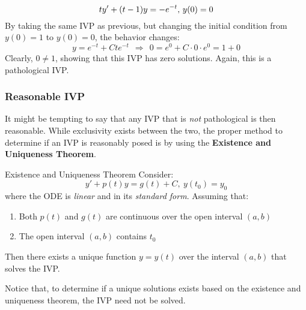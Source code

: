 \documentclass[12pt]{article}
\begin{document}
\begin{example}
  \begin{equation*}
    ty'+(t-1)y = -e^{-t}\textup{,}\ y(0) = 0
  \end{equation*}
  By taking the same IVP as previous, but changing the initial condition from $y(0) = 1$ to $y(0) = 0$, the behavior changes:
  \begin{equation*}
    y = e^{-t} + Cte^{-t}\ \  \Rightarrow\ \ 0 = e^{0} + C \cdot 0 \cdot e^{0} = 1 + 0
  \end{equation*}
  Clearly, $0 \neq 1$, showing that this IVP has zero solutions. Again, this is a pathological IVP.
\end{example}

\subsubsection{Reasonable IVP}
\label{sssec:reasonableIVP}

It might be tempting to say that any IVP that is \textit{not} pathological is then reasonable. While exclusivity exists between the two, the proper method to determine if an IVP is reasonably posed is by using the \textbf{Existence and Uniqueness Theorem}.

\begin{definition}{Existence and Uniqueness Theorem}
  Consider:
  \begin{equation*}
    y' + p(t)y = g(t) + C,\ y(t_0) = y_0
  \end{equation*}
  where the ODE is \textit{linear} and in its \textit{standard form}.
  Assuming that:
  \begin{enumerate}
    \itemsep-0.15em
    \item Both $p(t)$ and $g(t)$ are continuous over the open interval $(a,b)$
    \item The open interval $(a,b)$ contains $t_0$
  \end{enumerate}
  Then there exists a unique function $y = y(t)$ over the interval $(a,b)$ that solves the IVP.
\end{definition}

Notice that, to determine if a unique solutions exists based on the existence and uniqueness theorem, the IVP need not be solved.
\end{document}
